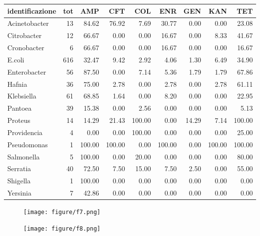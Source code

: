 \documentclass{article}
\begin{document}
\begin{table}[]
\centering
\begin{tabular}{l|r|r|r|r|r|r|r|r}
\hline
identificazione & tot & AMP & CFT & COL & ENR & GEN & KAN & TET\\
\hline
Acinetobacter & 13 & 84.62 & 76.92 & 7.69 & 30.77 & 0.00 & 0.00 & 23.08\\
\hline
Citrobacter & 12 & 66.67 & 0.00 & 0.00 & 16.67 & 0.00 & 8.33 & 41.67\\
\hline
Cronobacter & 6 & 66.67 & 0.00 & 0.00 & 16.67 & 0.00 & 0.00 & 16.67\\
\hline
E.coli & 616 & 32.47 & 9.42 & 2.92 & 4.06 & 1.30 & 6.49 & 34.90\\
\hline
Enterobacter & 56 & 87.50 & 0.00 & 7.14 & 5.36 & 1.79 & 1.79 & 67.86\\
\hline
Hafnia & 36 & 75.00 & 2.78 & 0.00 & 2.78 & 0.00 & 2.78 & 61.11\\
\hline
Klebsiella & 61 & 68.85 & 1.64 & 0.00 & 8.20 & 0.00 & 0.00 & 22.95\\
\hline
Pantoea & 39 & 15.38 & 0.00 & 2.56 & 0.00 & 0.00 & 0.00 & 5.13\\
\hline
Proteus & 14 & 14.29 & 21.43 & 100.00 & 0.00 & 14.29 & 7.14 & 100.00\\
\hline
Providencia & 4 & 0.00 & 0.00 & 100.00 & 0.00 & 0.00 & 0.00 & 25.00\\
\hline
Pseudomonas & 1 & 100.00 & 100.00 & 0.00 & 100.00 & 0.00 & 100.00 & 100.00\\
\hline
Salmonella & 5 & 100.00 & 0.00 & 20.00 & 0.00 & 0.00 & 0.00 & 80.00\\
\hline
Serratia & 40 & 72.50 & 7.50 & 15.00 & 7.50 & 2.50 & 0.00 & 55.00\\
\hline
Shigella & 1 & 100.00 & 0.00 & 0.00 & 0.00 & 0.00 & 0.00 & 0.00\\
\hline
Yersinia & 7 & 42.86 & 0.00 & 0.00 & 0.00 & 0.00 & 0.00 & 0.00\\
\hline
\end{tabular}
\end{table}

\begin{figure}[]
\texttt{[image: figure/f7.png]} \caption{}\label{fig:unnamed-chunk-1}
\end{figure}


\begin{figure}[]
\texttt{[image: figure/f8.png]} \caption{}\label{fig:unnamed-chunk-1}
\end{figure}
\end{document}
